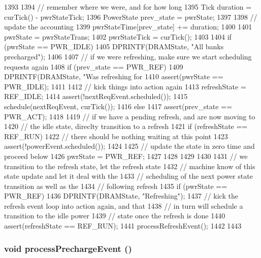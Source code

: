 \begin{DoxyCode}
1393 {
1394     // remember where we were, and for how long
1395     Tick duration = curTick() - pwrStateTick;
1396     PowerState prev_state = pwrState;
1397 
1398     // update the accounting
1399     pwrStateTime[prev_state] += duration;
1400 
1401     pwrState = pwrStateTrans;
1402     pwrStateTick = curTick();
1403 
1404     if (pwrState == PWR_IDLE) {
1405         DPRINTF(DRAMState, "All banks precharged\n");
1406 
1407         // if we were refreshing, make sure we start scheduling requests again
1408         if (prev_state == PWR_REF) {
1409             DPRINTF(DRAMState, "Was refreshing for %
1410             assert(pwrState == PWR_IDLE);
1411 
1412             // kick things into action again
1413             refreshState = REF_IDLE;
1414             assert(!nextReqEvent.scheduled());
1415             schedule(nextReqEvent, curTick());
1416         } else {
1417             assert(prev_state == PWR_ACT);
1418 
1419             // if we have a pending refresh, and are now moving to
1420             // the idle state, direclty transition to a refresh
1421             if (refreshState == REF_RUN) {
1422                 // there should be nothing waiting at this point
1423                 assert(!powerEvent.scheduled());
1424 
1425                 // update the state in zero time and proceed below
1426                 pwrState = PWR_REF;
1427             }
1428         }
1429     }
1430 
1431     // we transition to the refresh state, let the refresh state
1432     // machine know of this state update and let it deal with the
1433     // scheduling of the next power state transition as well as the
1434     // following refresh
1435     if (pwrState == PWR_REF) {
1436         DPRINTF(DRAMState, "Refreshing\n");
1437         // kick the refresh event loop into action again, and that
1438         // in turn will schedule a transition to the idle power
1439         // state once the refresh is done
1440         assert(refreshState == REF_RUN);
1441         processRefreshEvent();
1442     }
1443 }
\end{DoxyCode}
\hypertarget{classDRAMCtrl_aac7163c120622a5f0bcc2291bc3054cd}{
\subsubsection[{processPrechargeEvent}]{\setlength{\rightskip}{0pt plus 5cm}void processPrechargeEvent ()}}
\label{classDRAMCtrl_aac7163c120622a5f0bcc2291bc3054cd}



